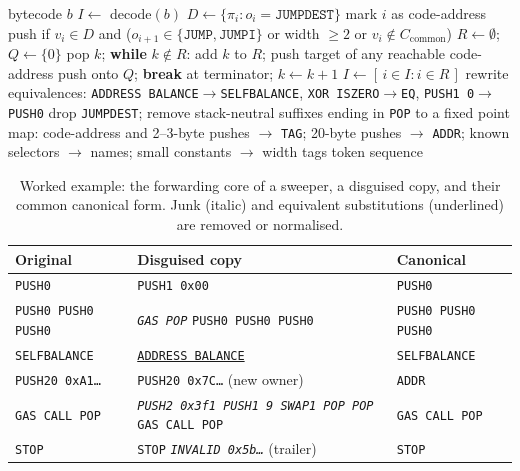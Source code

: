 \begin{algorithm}[t]
\caption{Canonicalisation $\kappa(b)$ of EVM bytecode}
\label{alg:canon}
\begin{algorithmic}[1]
\REQUIRE bytecode $b$
\STATE $I \leftarrow$ decode$(b)$ 
\STATE $D \leftarrow \{\pi_i : o_i=\texttt{JUMPDEST}\}$
\STATE mark $i$ as code-address push if $v_i\in D$ and ($o_{i+1}\in\{\texttt{JUMP},\texttt{JUMPI}\}$ or width $\ge 2$ or $v_i\notin C_{\text{common}}$)
\STATE $R \leftarrow \emptyset$; $Q \leftarrow \{0\}$ 
\STATE pop $k$; \textbf{while} $k\notin R$: add $k$ to $R$; push target of any reachable code-address push onto $Q$; \textbf{break} at terminator; $k\leftarrow k+1$
\ENDWHILE
\STATE $I \leftarrow [\,i\in I : i\in R\,]$
\STATE rewrite equivalences: \texttt{ADDRESS BALANCE}$\to$\texttt{SELFBALANCE}, \texttt{XOR ISZERO}$\to$\texttt{EQ}, \texttt{PUSH1 0}$\to$\texttt{PUSH0}
\STATE drop \texttt{JUMPDEST}; remove stack-neutral suffixes ending in \texttt{POP} to a fixed point
\STATE map: code-address and 2--3-byte pushes $\to$ \texttt{TAG}; 20-byte pushes $\to$ \texttt{ADDR}; known selectors $\to$ names; small constants $\to$ width tags
\RETURN token sequence
\end{algorithmic}
\end{algorithm}

\begin{table}[t]
\centering
\caption{Worked example: the forwarding core of a sweeper, a disguised copy, and their common canonical form. Junk (italic) and equivalent substitutions (underlined) are removed or normalised.}
\label{tab:canon-example}
\footnotesize
\setlength{\tabcolsep}{2pt}
\begin{tabular}{p{}p{}p{}}
\toprule
Original & Disguised copy & Canonical \\
\midrule
\texttt{PUSH0} & \texttt{PUSH1 0x00} & \texttt{PUSH0} \\
\texttt{PUSH0 PUSH0 PUSH0} & \emph{\texttt{GAS POP}} \texttt{PUSH0 PUSH0 PUSH0} & \texttt{PUSH0 PUSH0 PUSH0} \\
\texttt{SELFBALANCE} & \underline{\texttt{ADDRESS BALANCE}} & \texttt{SELFBALANCE} \\
\texttt{PUSH20 0xA1\ldots} & \texttt{PUSH20 0x7C\ldots} (new owner) & \texttt{ADDR} \\
\texttt{GAS CALL POP} & \emph{\texttt{PUSH2 0x3f1 PUSH1 9 SWAP1 POP POP}} \texttt{GAS CALL POP} & \texttt{GAS CALL POP} \\
\texttt{STOP} & \texttt{STOP} \emph{\texttt{INVALID 0x5b\ldots}} (trailer) & \texttt{STOP} \\
\bottomrule
\end{tabular}
\end{table}

